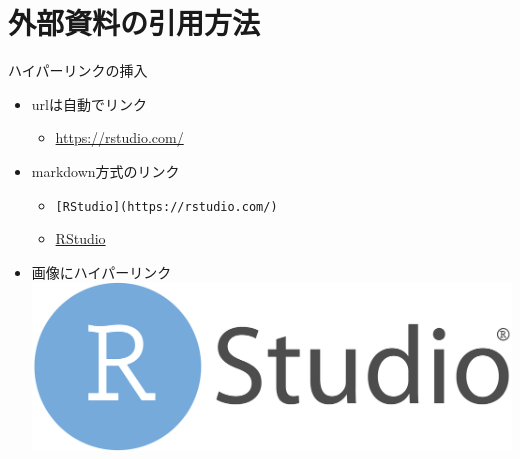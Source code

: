 \documentclass[
  14pt,
  ignorenonframetext,
]{beamer}
\providecommand{\tightlist}{%
  \setlength{\itemsep}{0pt}\setlength{\parskip}{0pt}}
\begin{document}
\hypertarget{ux5916ux90e8ux8cc7ux6599ux306eux5f15ux7528ux65b9ux6cd5}{%
\section{外部資料の引用方法}\label{ux5916ux90e8ux8cc7ux6599ux306eux5f15ux7528ux65b9ux6cd5}}

\begin{frame}[fragile]{ハイパーリンクの挿入}
\protect\hypertarget{ux30cfux30a4ux30d1ux30fcux30eaux30f3ux30afux306eux633fux5165}{}

\begin{itemize}
\tightlist
\item
  urlは自動でリンク

  \begin{itemize}
  \tightlist
  \item
    \url{https://rstudio.com/}
  \end{itemize}
\item
  markdown方式のリンク

  \begin{itemize}
  \tightlist
  \item
    \texttt{{[}RStudio{]}(https://rstudio.com/)}
  \item
    \href{https://rstudio.com/}{RStudio}
  \end{itemize}
\item
  画像にハイパーリンク
  \href{https://rstudio.com/}{\includegraphics[width=\textwidth,height=0.1\textheight]{img/RStudio-Logo-flat.pdf}}
\end{itemize}

\end{frame}
\end{document}

